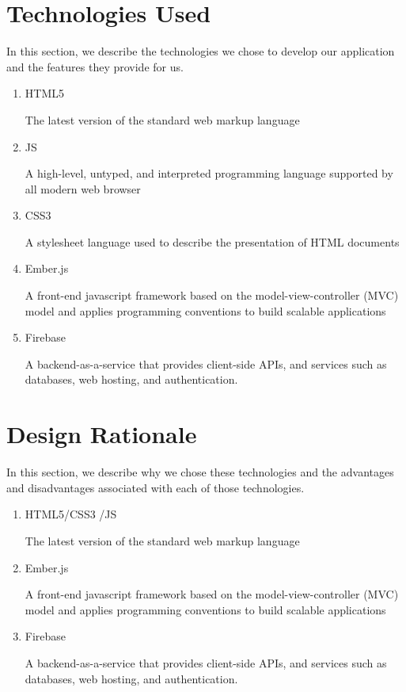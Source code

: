 \section{Technologies Used}
In this section, we describe the technologies we chose to develop our application and the features they provide for us.
\begin{enumerate}
\item HTML5 \par The latest version of the standard web markup language
\item JS \par A high-level, untyped, and interpreted programming  language supported by all modern web browser
\item CSS3 \par A stylesheet language used to describe the presentation of HTML documents
\item Ember.js \par A front-end javascript framework based on the model-view-controller (MVC) model and applies programming conventions to build scalable applications
\item  Firebase \par A backend-as-a-service that provides client-side APIs, and services such as databases, web hosting, and authentication.
\end{enumerate}

\section{Design Rationale}
In this section, we describe why we chose these technologies and the advantages and disadvantages associated with each of those technologies. 
\begin{enumerate}
\item HTML5/CSS3 /JS \par The latest version of the standard web markup language
	\begin{enumerate}
	
	\end{enumerate}
\item Ember.js \par A front-end javascript framework based on the model-view-controller (MVC) model and applies programming conventions to build scalable applications
\item  Firebase \par A backend-as-a-service that provides client-side APIs, and services such as databases, web hosting, and authentication.
\end{enumerate}